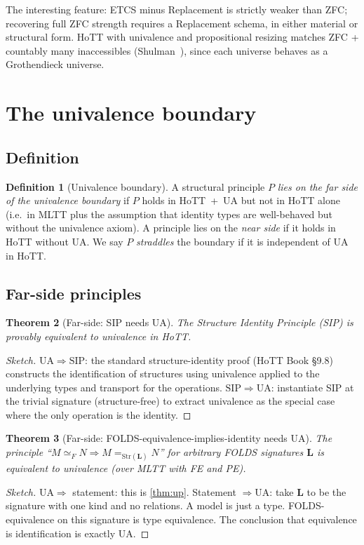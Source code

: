 \documentclass[12pt]{article}
\newtheorem{theorem}{Theorem}[section]
\theoremstyle{definition}
\newtheorem{definition}[theorem]{Definition}
\theoremstyle{remark}
\begin{document}
The interesting feature: ETCS minus Replacement is strictly weaker than ZFC; recovering
full ZFC strength requires a Replacement schema, in either material or structural form.
HoTT with univalence and propositional resizing matches ZFC + countably many
inaccessibles (Shulman~\cite{Shulman2019}), since each universe behaves as a Grothendieck
universe.

\section{The univalence boundary}
\label{sec:boundary}

\subsection{Definition}

\begin{definition}[Univalence boundary]
\label{def:boundary}
A structural principle $P$ \emph{lies on the far side of the univalence boundary} if
$P$ holds in HoTT~+~UA but not in HoTT alone (i.e.\ in MLTT plus the assumption that
identity types are well-behaved but without the univalence axiom). A principle lies on
the \emph{near side} if it holds in HoTT without UA. We say $P$ \emph{straddles} the
boundary if it is independent of UA in HoTT.
\end{definition}

\subsection{Far-side principles}

\begin{theorem}[Far-side: SIP needs UA]
\label{thm:sipneedsua}
The Structure Identity Principle (SIP) is provably equivalent to univalence in HoTT.
\end{theorem}
\begin{proof}[Sketch]
$\mathrm{UA}\Rightarrow \mathrm{SIP}$: the standard structure-identity proof (HoTT
Book \S9.8) constructs the identification of structures using univalence applied to the
underlying types and transport for the operations.
$\mathrm{SIP}\Rightarrow \mathrm{UA}$: instantiate SIP at the trivial signature
(structure-free) to extract univalence as the special case where the only operation is
the identity.
\end{proof}

\begin{theorem}[Far-side: FOLDS-equivalence-implies-identity needs UA]
\label{thm:foldsneedsua}
The principle ``$M\simeq_F N \Rightarrow M=_{\mathrm{Str}(\mathbf{L})}N$'' for arbitrary
FOLDS signatures $\mathbf{L}$ is equivalent to univalence (over MLTT with FE and PE).
\end{theorem}
\begin{proof}[Sketch]
$\mathrm{UA}\Rightarrow$ statement: this is \cref{thm:up}.
Statement $\Rightarrow \mathrm{UA}$: take $\mathbf{L}$ to be the signature with one kind
and no relations. A model is just a type. FOLDS-equivalence on this signature is type
equivalence. The conclusion that equivalence is identification is exactly UA.
\end{proof}
\end{document}

